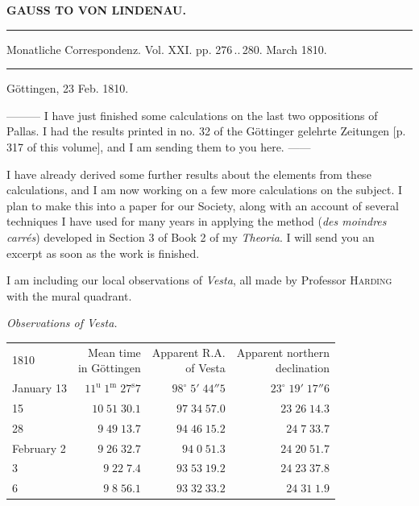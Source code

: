 \clearpage{}

\begin{center}\textbf{GAUSS TO VON LINDENAU.}\par\vspace{4pt}\hrule\vspace{4pt}\fontsize{10}{12}\selectfont Monatliche Correspondenz. Vol. XXI. pp. 276\,..\,280. March 1810.\par\vspace{4pt}\hrule\vspace{4pt}\end{center}
\begin{flushright}Göttingen, 23 Feb. 1810.\end{flushright}

\par\indent ---\enspace---\enspace--- I have just finished some calculations on the last two oppositions of Pallas. I had the results printed in no. 32 of the Göttinger gelehrte Zeitungen [p. 317 of this volume], and I am sending them to you here. ---\enspace---

I have already derived some further results about the elements from these calculations, and I am now working on a few more calculations on the subject. I plan to make this into a paper for our Society, along with an account of several techniques I have used for many years in applying the method (\emph{des moindres carrés}) developed in Section 3 of Book 2 of my \emph{Theoria}. I will send you an excerpt as soon as the work is finished.

I am including our local observations of \emph{Vesta}, all made by Professor \textsc{Harding} with the mural quadrant.

\begin{center}\emph{Observations of Vesta.}\end{center}
\begin{center}\fontsize{10}{12}\selectfont\setlength{\tabcolsep}{5pt}\renewcommand{\arraystretch}{1.15}\begin{tabular}{lrrr}
1810 & \shortstack{Mean time\\in Göttingen} & \shortstack{Apparent R.A.\\of Vesta} & \shortstack{Apparent northern\\declination}\\
January 13 & $11^{\text{u}}\;1^{\text{m}}\;27^{\text{s}}7$ & $98^\circ\;5'\;44''5$ & $23^\circ\;19'\;17''6$\\
15 & $10\;51\;30.1$ & $97\;34\;57.0$ & $23\;26\;14.3$\\
28 & $9\;49\;13.7$ & $94\;46\;15.2$ & $24\;7\;33.7$\\
February 2 & $9\;26\;32.7$ & $94\;0\;51.3$ & $24\;20\;51.7$\\
3 & $9\;22\;7.4$ & $93\;53\;19.2$ & $24\;23\;37.8$\\
6 & $9\;8\;56.1$ & $93\;32\;33.2$ & $24\;31\;1.9$\\
\end{tabular}\end{center}

